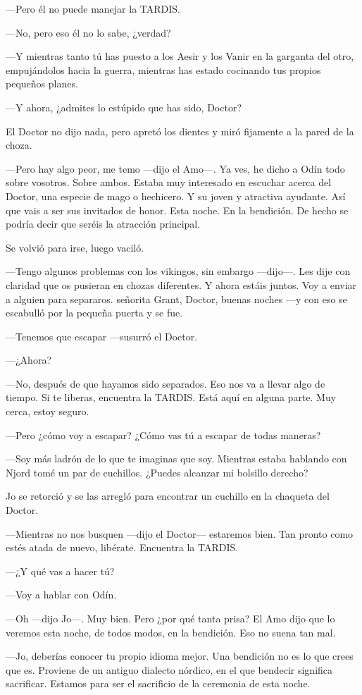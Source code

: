 ---Pero él no puede manejar la TARDIS.

---No, pero eso él no lo sabe, ¿verdad?

---Y mientras tanto tú has puesto a los Aesir y los Vanir en la garganta
del otro, empujándolos hacia la guerra, mientras has estado cocinando
tus propios pequeños planes.

---Y ahora, ¿admites lo estúpido que has sido, Doctor?

El Doctor no dijo nada, pero apretó los dientes y miró fijamente a la
pared de la choza.

---Pero hay algo peor, me temo ---dijo el Amo---. Ya ves, he dicho a
Odín todo sobre vosotros. Sobre ambos. Estaba muy interesado en escuchar
acerca del Doctor, una especie de mago o hechicero. Y su joven y
atractiva ayudante. Así que vais a ser sus invitados de honor. Esta
noche. En la bendición. De hecho se podría decir que seréis la atracción
principal.

Se volvió para irse, luego vaciló.

---Tengo algunos problemas con los vikingos, sin embargo ---dijo---. Les
dije con claridad que os pusieran en chozas diferentes. Y ahora estáis
juntos. Voy a enviar a alguien para separaros. señorita Grant, Doctor,
buenas noches ---y con eso se escabulló por la pequeña puerta y se fue.

---Tenemos que escapar ---susurró el Doctor.

---¿Ahora?

---No, después de que hayamos sido separados. Eso nos va a llevar algo
de tiempo. Si te liberas, encuentra la TARDIS. Está aquí en alguna
parte. Muy cerca, estoy seguro.

---Pero ¿cómo voy a escapar? ¿Cómo vas tú a escapar de todas maneras?

---Soy más ladrón de lo que te imaginas que soy. Mientras estaba
hablando con Njord tomé un par de cuchillos. ¿Puedes alcanzar mi
bolsillo derecho?

Jo se retorció y se las arregló para encontrar un cuchillo en la
chaqueta del Doctor.

---Mientras no nos busquen ---dijo el Doctor--- estaremos bien. Tan
pronto como estés atada de nuevo, libérate. Encuentra la TARDIS.

---¿Y qué vas a hacer tú?

---Voy a hablar con Odín.

---Oh ---dijo Jo---. Muy bien. Pero ¿por qué tanta prisa? El Amo dijo
que lo veremos esta noche, de todos modos, en la bendición. Eso no suena
tan mal.

---Jo, deberías conocer tu propio idioma mejor. Una bendición no es lo
que crees que es. Proviene de un antiguo dialecto nórdico, en el que
bendecir significa sacrificar. Estamos para ser el sacrificio de la
ceremonia de esta noche.